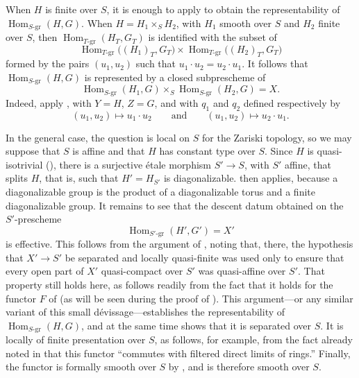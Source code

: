 When \(H\) is finite over \(S\), it is enough to apply
 to obtain the
representability of
\(\operatorname{Hom}_{S\text{-}\mathrm{gr}}(H,G)\).  When
\(H=H_1\times_SH_2\), with \(H_1\) smooth over \(S\) and \(H_2\)
finite over \(S\), then
\(\operatorname{Hom}_{T\text{-}\mathrm{gr}}(H_T,G_T)\) is identified
with the subset of
\[
 \operatorname{Hom}_{T\text{-}\mathrm{gr}}\bigl((H_1)_T,G_T\bigr)
 \times
 \operatorname{Hom}_{T\text{-}\mathrm{gr}}\bigl((H_2)_T,G_T\bigr)
\]
formed by the pairs \((u_1,u_2)\) such that
\(u_1\mathbin{\cdot}u_2=u_2\mathbin{\cdot}u_1\).  It follows that
\(\operatorname{Hom}_{S\text{-}\mathrm{gr}}(H,G)\) is represented
by a closed subprescheme of
\[
 \operatorname{Hom}_{S\text{-}\mathrm{gr}}(H_1,G)
 \times_S
 \operatorname{Hom}_{S\text{-}\mathrm{gr}}(H_2,G)=X.
\]
Indeed, apply , with \(Y=H\), \(Z=G\), and with
\(q_1\) and \(q_2\) defined respectively by
\[
  (u_1,u_2)\longmapsto u_1\mathbin{\cdot}u_2
  \qquad\text{and}\qquad
  (u_1,u_2)\longmapsto u_2\mathbin{\cdot}u_1.
\]

In the general case, the question is local on \(S\) for the Zariski
topology, so we may suppose that \(S\) is affine and that \(H\) has
constant type over \(S\).  Since \(H\) is quasi-isotrivial
(), there is a surjective étale morphism \(S'\to S\),
with \(S'\) affine, that splits \(H\), that is, such that
\(H'=H_{S'}\) is diagonalizable.   then applies,
because a diagonalizable group is the product of a diagonalizable
torus and a finite diagonalizable group.  It remains to see that the
descent datum obtained on the \(S'\)-prescheme
\[
  \operatorname{Hom}_{S'\text{-}\mathrm{gr}}(H',G')=X'
\]
is effective.  This follows from the argument of ,
noting that, there, the hypothesis that \(X'\to S'\) be separated
and locally quasi-finite was used only to ensure that every open
part of \(X'\) quasi-compact over \(S'\) was quasi-affine over
\(S'\).  That property still holds here, as follows readily from
the fact that it holds for the functor \(F\) of
 (as will be seen during the
proof of ).  This argument---or
any similar variant of this small dévissage---establishes the
representability of
\(\operatorname{Hom}_{S\text{-}\mathrm{gr}}(H,G)\), and at the same
time shows that it is separated over \(S\).  It is locally of finite
presentation over \(S\), as follows, for example, from the fact
already noted in  that this
functor ``commutes with filtered direct limits of rings.''  Finally,
the functor is formally smooth over \(S\) by
, and is therefore smooth
over \(S\).


